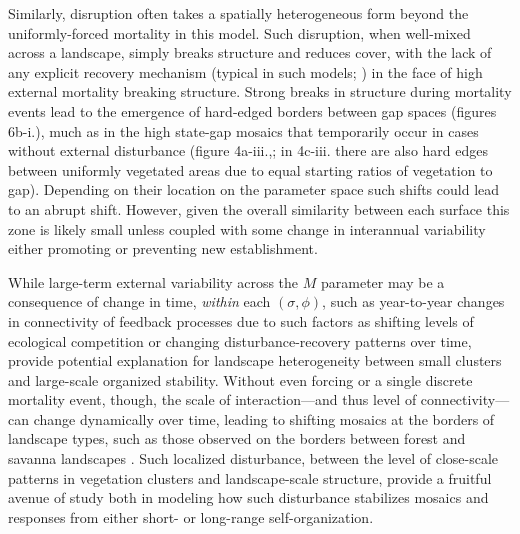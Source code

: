 \documentclass[10pt]{article}
\begin{document}
\begin{linenumbers}
Similarly, disruption often takes a spatially heterogeneous form beyond the uniformly-forced mortality in this model. Such disruption, when well-mixed across a landscape, simply breaks structure and reduces cover, with the lack of any explicit recovery mechanism (typical in such models; \citealt{Katori1998,Pascual2005}) in the face of high external mortality breaking structure. Strong breaks in structure during mortality events lead to the emergence of hard-edged borders between gap spaces (figures 6b-i.), much as in the high state-gap mosaics that temporarily occur in cases without external disturbance (figure 4a-iii.,; in 4c-iii. there are also hard edges between uniformly vegetated areas due to equal starting ratios of vegetation to gap). Depending on their location on the parameter space such shifts could lead to an abrupt shift. However, given the overall similarity between each surface this zone is likely small unless coupled with some change in interannual variability either promoting or preventing new establishment.

While large-term external variability across the $M$ parameter may be a consequence of change in time, \textit{within} each $(\sigma,\phi)$, such as year-to-year changes in connectivity of feedback processes due to such factors as shifting levels of ecological competition or changing disturbance-recovery patterns over time, provide potential explanation for landscape heterogeneity between small clusters and large-scale organized stability. Without even forcing or a single discrete mortality event, though, the scale of interaction---and thus level of connectivity---can change dynamically over time, leading to shifting mosaics at the borders of landscape types, such as those observed on the borders between forest and savanna landscapes \citep{Oliveras2016}. Such localized disturbance, between the level of close-scale patterns in vegetation clusters and landscape-scale structure, provide a fruitful avenue of study both in modeling how such disturbance stabilizes mosaics and responses from either short- or long-range self-organization.
\end{linenumbers}

\newpage
\end{document}

